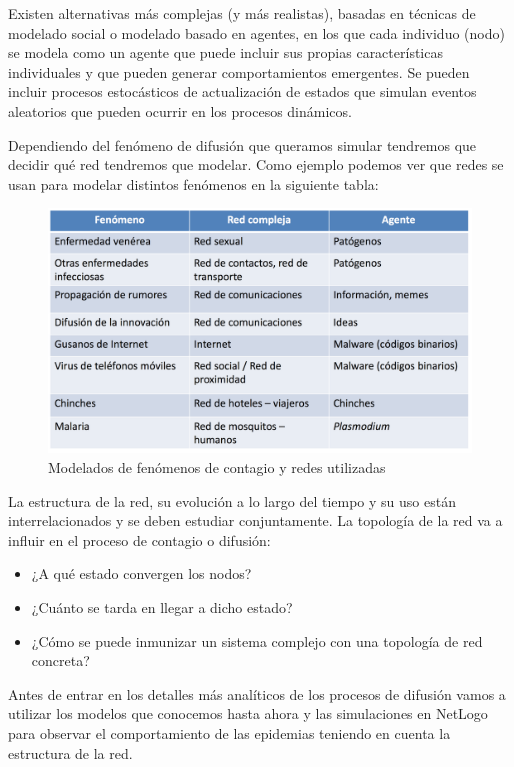 \documentclass[]{article}
\begin{document}
Existen alternativas más complejas (y más realistas), basadas en
técnicas de modelado social o modelado basado en agentes, en los que
cada individuo (nodo) se modela como un agente que puede incluir sus
propias características individuales y que pueden generar
comportamientos emergentes. Se pueden incluir procesos estocásticos de
actualización de estados que simulan eventos aleatorios que pueden
ocurrir en los procesos dinámicos.

Dependiendo del fenómeno de difusión que queramos simular tendremos que
decidir qué red tendremos que modelar. Como ejemplo podemos ver que
redes se usan para modelar distintos fenómenos en la siguiente tabla:

\begin{figure}[htbp]
\centering
\includegraphics{../images/tema08/tabla.png}
\caption{Modelados de fenómenos de contagio y redes utilizadas}
\end{figure}

La estructura de la red, su evolución a lo largo del tiempo y su uso
están interrelacionados y se deben estudiar conjuntamente. La topología
de la red va a influir en el proceso de contagio o difusión:

\begin{itemize}
\itemsep1pt\parskip0pt
\item
  ¿A qué estado convergen los nodos?
\item
  ¿Cuánto se tarda en llegar a dicho estado?
\item
  ¿Cómo se puede inmunizar un sistema complejo con una topología de red
  concreta?
\end{itemize}

Antes de entrar en los detalles más analíticos de los procesos de
difusión vamos a utilizar los modelos que conocemos hasta ahora y las
simulaciones en NetLogo para observar el comportamiento de las epidemias
teniendo en cuenta la estructura de la red.
\end{document}
